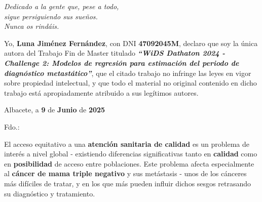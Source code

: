 %
% 



\cleardoublepage
\thispagestyle{empty}

\vspace*{9cm}  
\begin{flushright} \em 
Dedicado a la gente que, pese a todo,\\
sigue persiguiendo sus sueños.\\
Nunca os rindáis.
\end{flushright}


\cleardoublepage
\thispagestyle{plain}
\setcounter{page}{1} \null
\begin{center}
\Large{}
\end{center}
\vskip1cm

Yo, \textbf{Luna Jiménez Fernández}, con DNI \textbf{47092045M}, declaro que soy la única autora del Trabajo Fin de Master titulado \textbf{\textit{``WiDS Dathaton 2024 - Challenge 2: Modelos de regresión para estimación del periodo de diagnóstico metastático''}}, que el citado trabajo no infringe las leyes en vigor sobre propiedad intelectual, y que todo el material no original contenido en dicho trabajo está apropiadamente atribuido a sus legítimos autores.

\vspace*{2cm}
\begin{center}
Albacete, a \textbf{9} de \textbf{Junio} de \textbf{2025}

\vskip3cm

Fdo.: \textbf{\autor}
\end{center}


\cleardoublepage
\thispagestyle{plain}
\begin{center}
\Large{}
\end{center}
\vskip1cm

El acceso equitativo a una \textbf{atención sanitaria de calidad} es un problema de interés a nivel global - existiendo diferencias significativas tanto en \textbf{calidad} como en \textbf{posibilidad} de acceso entre poblaciones. Este problema afecta especialmente al \textbf{cáncer de mama triple negativo} y sus metástasis - unos de los cánceres más difíciles de tratar, y en los que más pueden influir dichos sesgos retrasando su diagnóstico y tratamiento.

